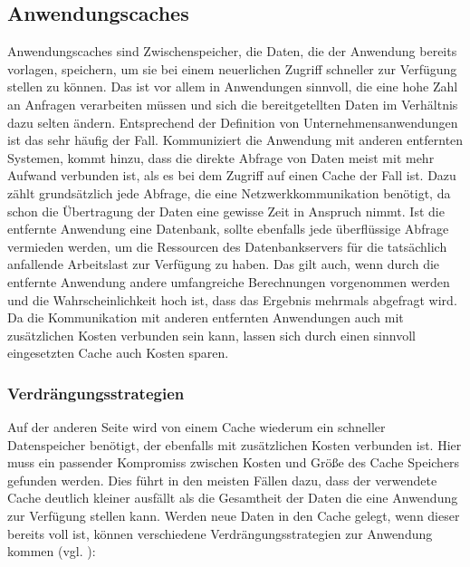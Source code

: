 \subsection{Anwendungscaches}\label{service:cache}
Anwendungscaches sind Zwischenspeicher, die Daten, die der Anwendung bereits
vorlagen, speichern, um sie bei einem neuerlichen Zugriff schneller zur Verfügung
stellen zu können. Das ist vor allem in Anwendungen sinnvoll, die eine hohe Zahl
an Anfragen verarbeiten müssen und sich die bereitgetellten Daten im Verhältnis
dazu selten ändern. Entsprechend der Definition von Unternehmensanwendungen ist
das sehr häufig der Fall. Kommuniziert die Anwendung mit anderen entfernten
Systemen, kommt hinzu, dass die direkte Abfrage von Daten meist mit mehr Aufwand
verbunden ist, als es bei dem Zugriff auf einen Cache der Fall ist. Dazu zählt
grundsätzlich jede Abfrage, die eine Netzwerkkommunikation benötigt, da schon die
Übertragung der Daten eine gewisse Zeit in Anspruch nimmt. Ist die entfernte
Anwendung eine Datenbank, sollte ebenfalls jede überflüssige Abfrage vermieden
werden, um die Ressourcen des Datenbankservers für die tatsächlich anfallende
Arbeitslast zur Verfügung zu haben. Das gilt auch, wenn durch die entfernte
Anwendung andere umfangreiche Berechnungen vorgenommen werden und die
Wahrscheinlichkeit hoch ist, dass das Ergebnis mehrmals abgefragt wird. Da die
Kommunikation mit anderen entfernten Anwendungen auch mit zusätzlichen Kosten
verbunden sein kann, lassen sich durch einen sinnvoll eingesetzten Cache auch
Kosten sparen.

\subsubsection{Verdrängungsstrategien}
Auf der anderen Seite wird von einem Cache wiederum ein schneller Datenspeicher
benötigt, der ebenfalls mit zusätzlichen Kosten verbunden ist. Hier muss ein
passender Kompromiss zwischen Kosten und Größe des Cache Speichers gefunden
werden. Dies führt in den meisten Fällen dazu, dass der verwendete Cache deutlich
kleiner ausfällt als die Gesamtheit der Daten die eine Anwendung zur Verfügung
stellen kann. Werden neue Daten in den Cache gelegt, wenn dieser bereits voll
ist, können verschiedene Verdrängungsstrategien zur
Anwendung kommen (vgl. \cite{wiki:cachealgorithms}):

